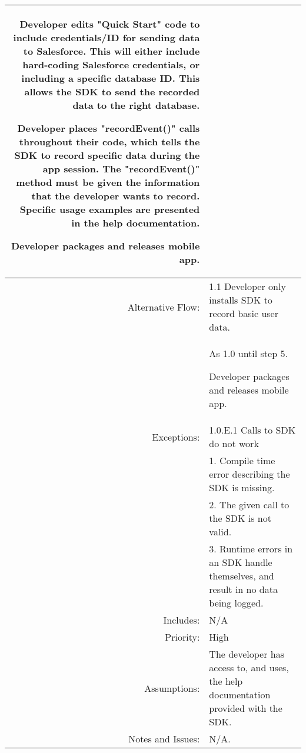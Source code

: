 \documentclass[12pt,oneside,letterpaper]{article}
\newenvironment{packed_enumerate}{ %
\vspace{-7mm}
\begin{enumerate}
  \setlength{\itemsep}{0pt}
  \setlength{\parskip}{0pt}
  \setlength{\parsep}{0pt}
}{\end{enumerate}
\vspace{-8mm}}
\begin{document}
\begin{longtable}{|r|p{3.8in}|}
\begin{packed_enumerate}
\item Developer edits "Quick Start" code to include credentials/ID for sending data to Salesforce. This will either include hard-coding Salesforce credentials, or including a specific database ID. This allows the SDK to send the recorded data to the right database.
\item Developer places "recordEvent()" calls throughout their code, which tells the SDK to record specific data during the app session. The "recordEvent()" method must be given the information that the developer wants to record. Specific usage examples are presented in the help documentation.
\item Developer packages and releases mobile app.
\end{packed_enumerate}\\
\hline
Alternative Flow:&1.1 Developer only installs SDK to record basic user data. \\
&  %
\begin{packed_enumerate}
\item As 1.0 until step 5.
\item Developer packages and releases mobile app.
\end{packed_enumerate}\\
\hline
Exceptions:&1.0.E.1 Calls to SDK do not work\\
&1. Compile time error describing the SDK is missing.\\
&2. The given call to the SDK is not valid.\\
&3. Runtime errors in an SDK handle themselves, and result in no data being logged.\\
\hline
Includes:&N/A\\
\hline
Priority:&High\\
\hline
Assumptions:&The developer has access to, and uses, the help documentation provided with the SDK.\\
\hline
Notes and Issues:&N/A.\\

\hline
\end{longtable}

\newpage
\end{document}
